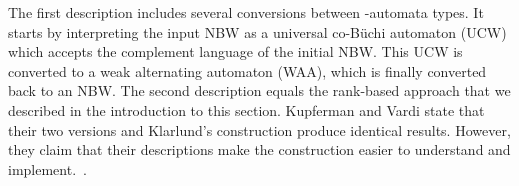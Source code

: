 The first description includes several conversions between \om-automata types. It starts by interpreting the input NBW as a universal co-Büchi automaton (UCW) which accepts the complement language of the initial NBW. This UCW is converted to a weak alternating automaton (WAA), which is finally converted back to an NBW. The second description equals the rank-based approach that we described in the introduction to this section. Kupferman and Vardi state that their two versions and Klarlund's construction produce identical results. However, they claim that their descriptions make the construction easier to understand and implement.~\cite{Kupferman:2001}.






